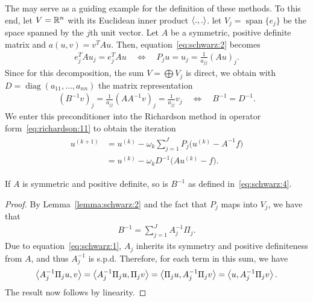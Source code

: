 \begin{example}
  \label{example:schwarz:Jacobi}
  The  may serve as a guiding example for the
  definition of these methods. To this end, let $V = \mathbb R^n$ with its
  Euclidean inner product $\scal(.,.)$. let $V_j =
  \operatorname{span}\{e_j\}$ be the space spanned by the $j$th unit
  vector. Let $A$ be a symmetric, positive definite matrix and $a(u,v)
  = v^T A u$. Then, equation~\eqref{eq:schwarz:2} becomes
  \begin{gather}
    \label{eq:schwarz:27}
    e_j^T A u_j = e_j^T A u
    \quad \Leftrightarrow \quad
    P_j u = u_j = \frac1{a_{j j}}(A u)_j.
  \end{gather}
  Since for this decomposition, the sum $V=\bigoplus V_j$ is direct,
  we obtain with $D=\operatorname{diag}(a_{11},\dots,a_{n n})$ the
  matrix representation
  \begin{gather*}
    (B^{-1} v)_j = \frac1{a_{j j}}(A A^{-1} v)_j = \frac1{a_{j j}} v_j
    \quad \Leftrightarrow \quad
    B^{-1} = D^{-1}.
  \end{gather*}
  We enter this preconditioner into the Richardson method in operator
  form~\eqref{eq:richardson:11} to obtain the iteration
  \begin{gather}
    \label{eq:schwarz:28}
    \begin{split}
      u^{(k+1)} &= u^{(k)} - \omega_k \sum_{j=1}^J P_j \bigl(u^{(k)} -
      A^{-1}f\bigr)\\
      &= u^{(k)} - \omega_k D^{-1} \bigl(A u^{(k)} - f\bigr).
    \end{split}
  \end{gather}
\end{example}

\begin{lemma}
  \label{lemma:schwarz:3}
  If $A$ is symmetric and positive definite, so is $B^{-1}$ as defined
  in~\eqref{eq:schwarz:4}.
\end{lemma}

\begin{proof}
  By Lemma~\ref{lemma:schwarz:2} and the fact that $P_j$ maps into $V_j$, we have that
  \begin{gather}
    \label{eq:schwarz:16}
    B^{-1} = \sum_{j=1}^J A_j^{-1} \Pi_j.
  \end{gather}
  Due to equation~\eqref{eq:schwarz:1}, $A_j$ inherits its symmetry
  and positive definiteness from $A$, and thus $A_j^{-1}$ is s.p.d.
  Therefore, for each term in this sum, we have
  \begin{gather*}
    \scal(A_j^{-1} \Pi_j u, v)
    = \scal(A_j^{-1} \Pi_j u, \Pi_j v)
    = \scal( \Pi_j u, A_j^{-1}\Pi_j v)
    = \scal(u, A_j^{-1}\Pi_j v).
  \end{gather*}
  The result now follows by linearity.
\end{proof}

